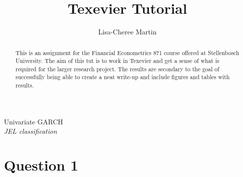 \documentclass[11pt,preprint, authoryear]{elsarticle}
\numberwithin{equation}{section}
\numberwithin{figure}{section}
\numberwithin{table}{section}
\begin{document}
\begin{frontmatter}  %

\title{Texevier Tutorial}





\author[Add1]{Lisa-Cheree Martin}





\address[Add1]{Stellenbosch University, Stellenbosch, South Africa}


\begin{abstract}
\small{
This is an assignment for the Financial Econometrics 871 course offered
at Stellenbosch University. The aim of this tut is to work in Texevier
and get a sense of what is required for the larger research project. The
results are secondary to the goal of successfully being able to create a
neat write-up and include figures and tables with results.
}
\end{abstract}

\vspace{1cm}

\begin{keyword}
\footnotesize{
Univariate GARCH \\ \vspace{0.3cm}
\textit{JEL classification} 
}
\end{keyword}
\vspace{0.5cm}
\end{frontmatter}



\pagestyle{fancy}
\chead{}
\lfoot{}
\lhead{}
\cfoot{}


\headsep 35pt %




\section{\texorpdfstring{Question 1
\label{Q1}}{Question 1 }}\label{question-1}
\end{document}
